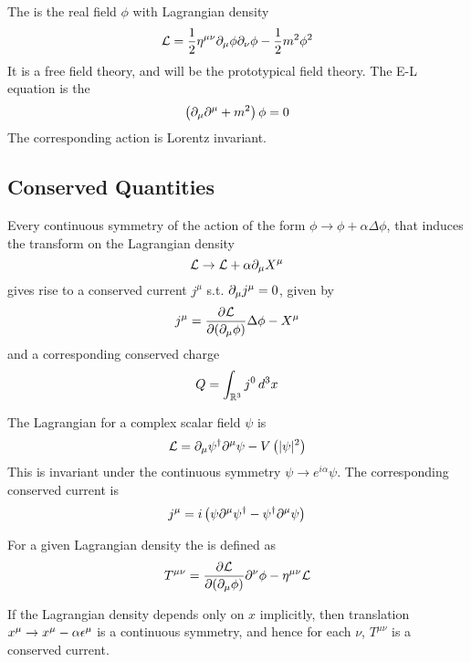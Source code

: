 \documentclass{article}
\begin{document}
\begin{definition}
The  is the real field $\phi$ with Lagrangian density
\[
\mc{L}=\frac{1}{2}\eta^{\mu\nu} \del_\mu\phi \del_\nu\phi-\frac{1}{2}m^2\phi^2
\]
It is a free field theory, and will be the prototypical field theory. The E-L equation is the 
\[
\left( \del_\mu \del^\mu + m^2 \right)\phi=0
\]
The corresponding action is Lorentz invariant. 
\end{definition}


\subsection{Conserved Quantities}

\begin{theorem}
Every continuous symmetry of the action of the form $\phi\to\phi+\alpha\Delta\phi$, that induces the transform on the Lagrangian density 
\[
\mc{L} \to \mc{L}+\alpha \del_\mu X^\mu
\]
gives rise to a conserved current $j^\mu$ s.t. $\del_\mu j^\mu = 0$, given by
\[
j^\mu = \pd[\mc{L}]{(\del_\mu \phi)}\Delta\phi-X^\mu
\]
and a corresponding conserved charge
\[
Q=\int_{\mbb{R}^3} j^0 \, d^3x
\]
\end{theorem}

\begin{example}
The Lagrangian for a complex scalar field $\psi$ is 
\[
\mc{L}=\del_\mu \psi^\dagger \del^\mu \psi - V\left(|\psi|^2\right)
\]
This is invariant under the continuous symmetry $\psi \to e^{i\alpha}\psi$. The corresponding conserved current is 
\[
j^\mu=i\left( \psi\del^\mu\psi^\dagger-\psi^\dagger\del^\mu\psi \right)
\]
\end{example}

\begin{definition}
For a given Lagrangian density the  is defined as  
\[
T^{\mu\nu}=\pd[\mc{L}]{(\del_\mu \phi)} \del^\nu \phi - \eta^{\mu\nu}\mc{L}
\]
\end{definition}

\begin{theorem}
If the Lagrangian density depends only on $x$ implicitly, then translation $x^\mu \to x^\mu-\alpha\eps^\mu$ is a continuous symmetry, and hence for each $\nu$, $T^{\mu\nu}$ is a conserved current. 
\end{theorem}
\end{document}
